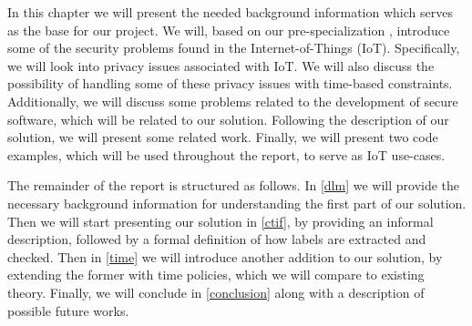 
In this chapter we will present the needed background information which serves as the base for our project.
We will, based on our pre-specialization \cite{prespecialization}, introduce some of the security problems found in the Internet-of-Things (IoT).
Specifically, we will look into privacy issues associated with IoT.
We will also discuss the possibility of handling some of these privacy issues with time-based constraints.
Additionally, we will discuss some problems related to the development of secure software, which will be related to our solution.
Following the description of our solution, we will present some related work.
Finally, we will present two code examples, which will be used throughout the report, to serve as IoT use-cases.

The remainder of the report is structured as follows.
In \cref{dlm} we will provide the necessary background information for understanding the first part of our solution.
Then we will start presenting our solution in \cref{ctif}, by providing an informal description, followed by a formal definition of how labels are extracted and checked.
Then in \cref{time} we will introduce another addition to our solution, by extending the former with time policies, which we will compare to existing theory.
Finally, we will conclude in \cref{conclusion} along with a description of possible future works.
